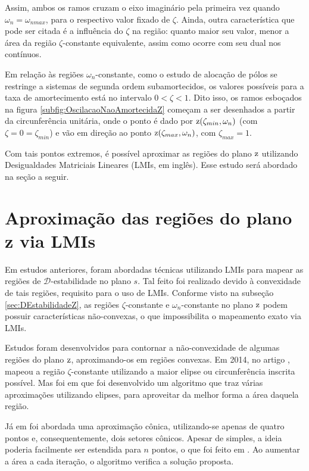 Assim, ambos os ramos cruzam o eixo imaginário pela primeira vez quando $\omega_n = \omega_{nmax}$, para o respectivo valor fixado de $\zeta$. Ainda, outra característica que pode ser citada é a influência do $\zeta$ na região: quanto maior seu valor, menor a área da região $\zeta$-constante equivalente, assim como ocorre com seu dual nos contínuos.

Em relação às regiões $\omega_n$-constante, como o estudo de alocação de pólos se restringe a sistemas de segunda ordem subamortecidos\cite{NISE2011,OGATA2011}, os valores possíveis para a taxa de amortecimento está no intervalo $0 < \zeta < 1$. Dito isso, os ramos esboçados na figura \ref{subfig:OscilacaoNaoAmortecidaZ} começam a ser desenhados a partir da circunferência unitária, onde o ponto é dado por $\operatorname{\mathrm{z}}(\zeta_{min},\omega_n)$ (com $\zeta = 0 = \zeta_{min}$) e vão em direção ao ponto $\operatorname{\mathrm{z}}(\zeta_{max},\omega_n)$, com $\zeta_{max} = 1$.

Com tais pontos extremos, é possível aproximar as regiões do plano $\operatorname{\mathrm{z}}$ utilizando Desigualdades Matriciais Lineares (LMIs, em inglês). Esse estudo será abordado na seção a seguir.

\section{Aproximação das regiões do plano z via LMIs}
Em estudos anteriores, foram abordadas técnicas utilizando LMIs para mapear as regiões de $\mathscr{D}$-estabilidade no plano $s$. Tal feito foi realizado devido à convexidade de tais regiões, requisito para o uso de LMIs. Conforme visto na subseção \ref{sec:DEstabilidadeZ}, as regiões $\zeta$-constante e $\omega_n$-constante no plano $\operatorname{\mathrm{z}}$ podem possuir características não-convexas, o que impossibilita o mapeamento exato via LMIs.

Estudos foram desenvolvidos para contornar a não-convexidade de algumas regiões do plano $\operatorname{\mathrm{z}}$, aproximando-os em regiões convexas. Em 2014, no artigo ,  mapeou a região $\zeta$-constante utilizando a maior elipse ou circunferência inscrita possível. Mas foi em  que foi desenvolvido um algoritmo que traz várias aproximações utilizando elipses, para aproveitar da melhor forma a área daquela região.

Já em  foi abordada uma aproximação cônica, utilizando-se apenas de quatro pontos e, consequentemente, dois setores cônicos. Apesar de simples, a ideia poderia facilmente ser estendida para $n$ pontos, o que foi feito em . Ao aumentar a área a cada iteração, o algoritmo verifica a solução proposta.

